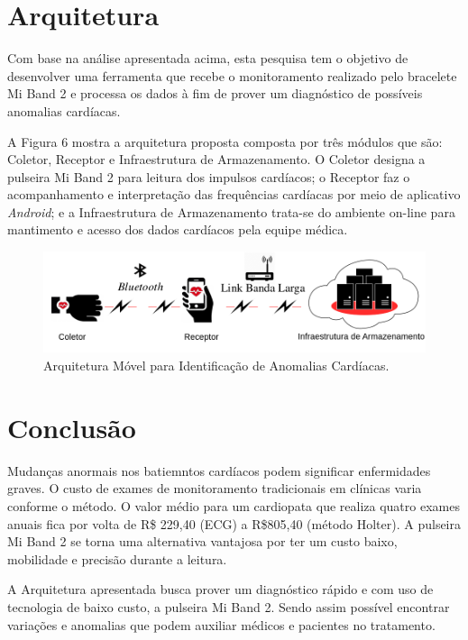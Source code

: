 \documentclass[12pt]{article}
\begin{document}
\section{Arquitetura}

Com base na análise apresentada acima, esta pesquisa tem o objetivo de desenvolver uma ferramenta que recebe o monitoramento realizado pelo bracelete Mi Band 2 e processa os dados à fim de prover um diagnóstico de possíveis anomalias cardíacas.

A Figura 6 mostra a arquitetura proposta composta por três módulos que são: Coletor, Receptor e Infraestrutura de Armazenamento. O Coletor designa a pulseira Mi Band 2 para leitura dos impulsos cardíacos; o Receptor faz o acompanhamento e interpretação das frequências cardíacas por meio de aplicativo \textit{Android}; e a Infraestrutura de Armazenamento trata-se do ambiente on-line para mantimento e acesso  dos dados cardíacos pela equipe médica.

\begin{figure}[H]
\centering
\includegraphics[width=.40\linewidth, frame]{Arquitetura.png}
\caption{Arquitetura Móvel para Identificação de Anomalias Cardíacas.}
\label{fig:exampleFig5}
\end{figure}

\section{Conclusão}


Mudanças anormais nos batiemntos cardíacos podem significar enfermidades graves. O custo de exames de monitoramento tradicionais em clínicas varia conforme o método. O valor médio para um cardiopata que realiza quatro exames anuais fica por volta de R\$ 229,40 (ECG) a R\$805,40 (método Holter). A pulseira Mi Band 2 se torna uma alternativa vantajosa por ter um custo baixo, mobilidade e precisão durante a leitura.


A Arquitetura apresentada busca prover um diagnóstico rápido e com uso de tecnologia de baixo custo, a pulseira Mi Band 2.  Sendo assim possível encontrar variações e anomalias que podem auxiliar médicos e pacientes no tratamento.



\end{document}
